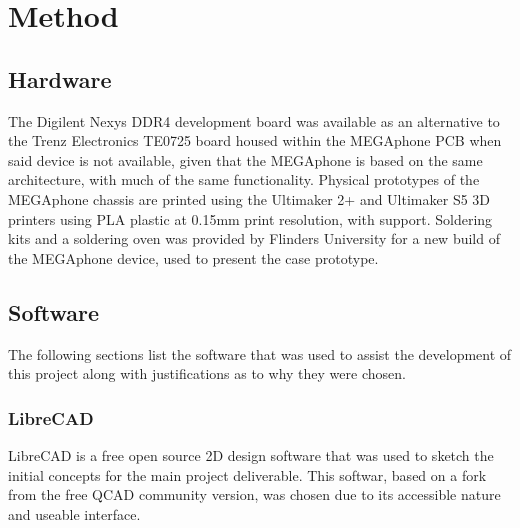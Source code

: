 
\chapter{Method} %

\label{Chapter3} %


\section{Hardware}

The Digilent Nexys DDR4 development board was available as an alternative to the Trenz Electronics TE0725 board housed within the MEGAphone PCB when said device is not available, given that the MEGAphone is based on the same architecture, with much of the same functionality.
Physical prototypes of the MEGAphone chassis are printed using the Ultimaker 2+ and Ultimaker S5 3D printers using PLA plastic at 0.15mm print resolution, with support.
Soldering kits and a soldering oven was provided by Flinders University for a new build of the MEGAphone device, used to present the case prototype.


\section{Software}

The following sections list the software that was used to assist the development of this project along with justifications as to why they were chosen.


\subsection{LibreCAD}

LibreCAD is a free open source 2D design software that was used to sketch the initial concepts for the main project deliverable. 
This softwar, based on a fork from the free QCAD community version, was chosen due to its accessible nature and useable interface.

